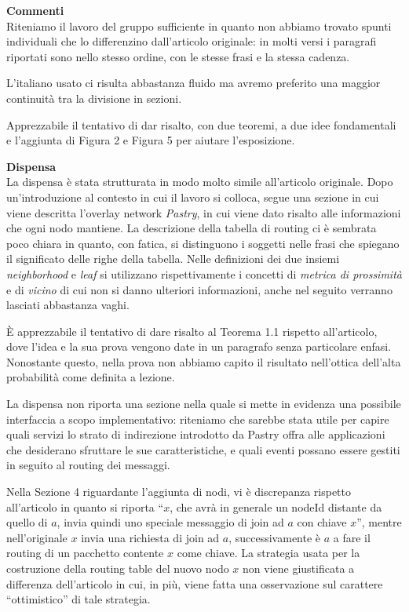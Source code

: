 \documentclass[11pt]{article}
\begin{document}
\theform
\begin{formalreport}
  \textbf{Commenti}\\
  Riteniamo il lavoro del gruppo sufficiente in quanto non abbiamo
  trovato spunti individuali che lo differenzino dall'articolo
  originale: in molti versi i paragrafi riportati sono nello stesso
  ordine, con le stesse frasi e la stessa cadenza.

  L'italiano usato ci risulta abbastanza fluido ma avremo preferito
  una maggior continuit\`a tra la divisione in sezioni.

  Apprezzabile il tentativo di dar risalto, con due teoremi, a due
  idee fondamentali e l'aggiunta di Figura 2 e Figura 5 per aiutare
  l'esposizione.

  \textbf{Dispensa}\\
  La dispensa \`e stata strutturata in modo molto simile all'articolo
  originale. Dopo un'introduzione al contesto in cui il lavoro si
  colloca, segue una sezione in cui viene descritta l'overlay network
  \emph{Pastry}, in cui viene dato risalto alle informazioni che ogni
  nodo mantiene. La descrizione della tabella di routing ci \`e
  sembrata poco chiara in quanto, con fatica, si distinguono i
  soggetti nelle frasi che spiegano il significato delle righe della
  tabella. Nelle definizioni dei due insiemi \emph{neighborhood} e
  \emph{leaf} si utilizzano rispettivamente i concetti di
  \emph{metrica di prossimit\`a} e di \emph{vicino} di cui non si
  danno ulteriori informazioni, anche nel seguito verranno lasciati
  abbastanza vaghi.

  \`E apprezzabile il tentativo di dare risalto al Teorema 1.1
  rispetto all'articolo, dove l'idea e la sua prova vengono date in un
  paragrafo senza particolare enfasi. Nonostante questo, nella prova
  non abbiamo capito il risultato nell'ottica dell'alta probabilit\`a
  come definita a lezione.

  La dispensa non riporta una sezione nella quale si mette in evidenza
  una possibile interfaccia a scopo implementativo: riteniamo che
  sarebbe stata utile per capire quali servizi lo strato di
  indirezione introdotto da Pastry offra alle applicazioni che
  desiderano sfruttare le sue caratteristiche, e quali eventi possano
  essere gestiti in seguito al routing dei messaggi.

  Nella Sezione 4 riguardante l'aggiunta di nodi, vi \`e discrepanza
  rispetto all'articolo in quanto si riporta ``$x$, che avr\`a in
  generale un nodeId distante da quello di $a$, invia quindi uno
  speciale messaggio di join ad $a$ con chiave $x$'', mentre
  nell'originale $x$ invia una richiesta di join ad $a$,
  successivamente \`e $a$ a fare il routing di un pacchetto contente
  $x$ come chiave. La strategia usata per la costruzione della routing
  table del nuovo nodo $x$ non viene giustificata a differenza
  dell'articolo in cui, in pi\`u, viene fatta una osservazione sul
  carattere ``ottimistico'' di tale strategia.


\end{formalreport}
\end{document}
